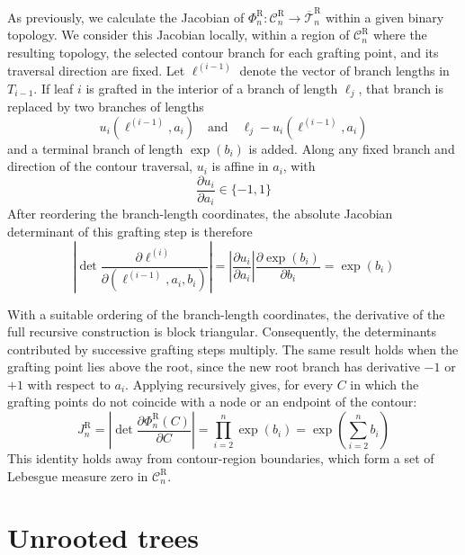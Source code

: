 \documentclass{article}
\begin{document}
As previously, we calculate the Jacobian of
$\Phi_n^\mathrm{R}:\mathcal{C}_n^\mathrm{R}\rightarrow
\overline{\mathcal{T}}_n^\mathrm{R}$ within a given binary topology.
We consider this Jacobian locally, within a region of
$\mathcal C_n^\mathrm{R}$ where the resulting topology, the selected contour
branch for each grafting point, and its traversal direction are fixed.
Let $\boldsymbol\ell^{(i-1)}$ denote the vector of branch lengths in $T_{i-1}$. If leaf $i$ is grafted in the interior of a branch of length $\ell_j$, that branch is replaced by two branches of lengths
\begin{equation*}
u_i(\boldsymbol\ell^{(i-1)},a_i)
\quad\text{and}\quad
\ell_j-u_i(\boldsymbol\ell^{(i-1)},a_i)
\end{equation*}
and a terminal branch of length $\exp(b_i)$ is added. Along any fixed branch and direction of the contour traversal, $u_i$ is affine in $a_i$, with
\begin{equation*}
\frac{\partial u_i}{\partial a_i} \in \{-1,1\}
\end{equation*}
After reordering the branch-length coordinates, the absolute Jacobian determinant of this grafting step is therefore
\begin{equation*}
\left|
\det\frac{\partial\boldsymbol\ell^{(i)}}
{\partial(\boldsymbol\ell^{(i-1)},a_i,b_i)}
\right|
=
\left|\frac{\partial u_i}{\partial a_i}\right|
\frac{\partial\exp(b_i)}{\partial b_i}
=\exp(b_i)
\end{equation*}

With a suitable ordering of the branch-length coordinates, the derivative
of the full recursive construction is block triangular. Consequently, the
determinants contributed by successive grafting steps multiply.
The same result holds when the grafting point lies above the root, since the new root branch has derivative $-1$ or $+1$ with respect to $a_i$. Applying recursively gives, for every $C$ in which the grafting points do not coincide with a node or an endpoint of the contour:
\begin{equation}\label{eq:jacobian2}
J_n^\mathrm{R}=\left|
\det\frac{\partial\Phi_n^\mathrm{R}(C)}{\partial C}
\right|
=\prod_{i=2}^n\exp(b_i)
=\exp\!\left(\sum_{i=2}^n b_i\right)
\end{equation}
This identity holds away from contour-region boundaries, which form a set
of Lebesgue measure zero in $\mathcal{C}_n^\mathrm{R}$.

\section{Unrooted trees}
\end{document}
